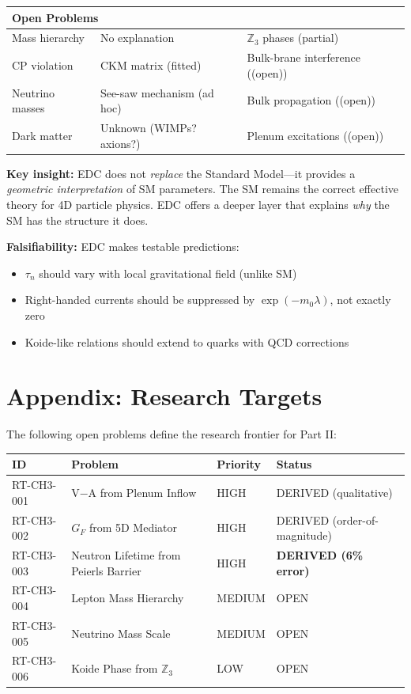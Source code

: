 \documentclass[11pt,a4paper]{book}
\theoremstyle{definition}
\theoremstyle{remark}
\begin{document}
\begin{center}
\begin{longtable}{p{4cm}p{5cm}p{5cm}}
\multicolumn{3}{l}{\textbf{Open Problems}} \\
\midrule
Mass hierarchy & No explanation & $\mathbb{Z}_3$ phases (partial) \\
CP violation & CKM matrix (fitted) & Bulk-brane interference ((open)) \\
Neutrino masses & See-saw mechanism (ad hoc) & Bulk propagation ((open)) \\
Dark matter & Unknown (WIMPs? axions?) & Plenum excitations ((open)) \\

\end{longtable}
\end{center}

\textbf{Key insight:} EDC does not \emph{replace} the Standard Model---it provides
a \emph{geometric interpretation} of SM parameters. The SM remains the correct
effective theory for 4D particle physics. EDC offers a deeper layer that explains
\emph{why} the SM has the structure it does.

\textbf{Falsifiability:} EDC makes testable predictions:
\begin{itemize}
  \item $\tau_n$ should vary with local gravitational field (unlike SM)
  \item Right-handed currents should be suppressed by $\exp(-m_0\lambda)$, not exactly zero
  \item Koide-like relations should extend to quarks with QCD corrections
\end{itemize}

\backmatter

\chapter*{Appendix: Research Targets}

The following open problems define the research frontier for Part II:

\begin{center}
\begin{tabular}{llll}
\toprule
\textbf{ID} & \textbf{Problem} & \textbf{Priority} & \textbf{Status} \\
\midrule
RT-CH3-001 & V$-$A from Plenum Inflow & HIGH & DERIVED (qualitative) \\
RT-CH3-002 & $G_F$ from 5D Mediator & HIGH & DERIVED (order-of-magnitude) \\
RT-CH3-003 & Neutron Lifetime from Peierls Barrier & HIGH & \textbf{DERIVED (6\% error)} \\
RT-CH3-004 & Lepton Mass Hierarchy & MEDIUM & OPEN \\
RT-CH3-005 & Neutrino Mass Scale & MEDIUM & OPEN \\
RT-CH3-006 & Koide Phase from $\mathbb{Z}_3$ & LOW & OPEN \\
\bottomrule
\end{tabular}
\end{center}
\end{document}
